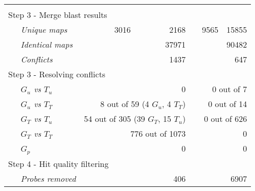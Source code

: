 \begin{table}[t]
\begin{threeparttable}
\begin{footnotesize}
\begin{tabular}{@{}p{3cm}r|rcr|r}
	\multicolumn{6}{l}{}\\
				
		\multicolumn{6}{l}{Step 3 - Merge blast results} \\[.2ex]
	{\it ~~~Unique maps\tnote{7}} & 3016 & 2168 && 9565 & 15855 \\
	{\it ~~~Identical maps\tnote{8}} & \multicolumn{2}{r}{37971} && 
			\multicolumn{2}{r}{90482} \\
	{\it ~~~Conflicts\tnote{9}} & \multicolumn{2}{r}{1437} && 
			\multicolumn{2}{r}{647} \\
		[1.5ex]

		\multicolumn{6}{l}{Step 3 - Resolving conflicts\tnote{7}} \\[.2ex]	
	{\it ~~~$G_u$ vs $T_u$} & \multicolumn{2}{r}{0} && 
			\multicolumn{2}{r}{0 out of 7} \\
	{\it ~~~$G_u$ vs $T_T$} & \multicolumn{2}{r}{8 out of 59 (4 $G_u$, 4 
			$T_T$)} && \multicolumn{2}{r}{0 out of 14} \\
	{\it ~~~$G_T$ vs $T_u$} & \multicolumn{2}{r}{54 out of 305 (39 $G_T$, 
			15 $T_u$)} && \multicolumn{2}{r}{0 out of 626} \\	
	{\it ~~~$G_T$ vs $T_T$} & \multicolumn{2}{r}{776 out of 1073} && 
			\multicolumn{2}{r}{0} \\
	{\it ~~~$G_p$} & \multicolumn{2}{r}{0} && \multicolumn{2}{r}{0} \\[1.5ex]
	
		\multicolumn{6}{l}{Step 4 - Hit quality filtering} \\[.2ex]
	{\it ~~~Probes removed\tnote{10}} & \multicolumn{2}{r}{406} && 
			\multicolumn{2}{r}{6907} \\[1.5ex]
		

\end{tabular}
\end{footnotesize}
\end{threeparttable}
\end{table}
